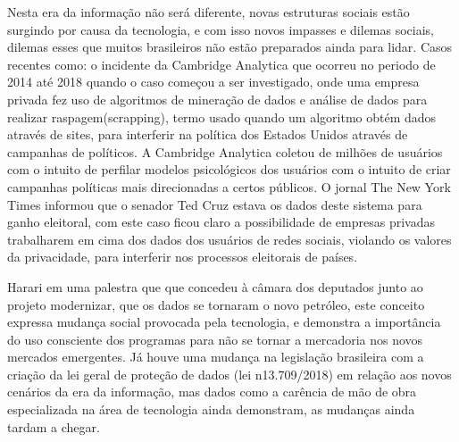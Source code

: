\documentclass[article, 11pt, oneside, a4paper, english, brazil, sumario=tradicional]{abntex2}
\begin{document}
    Nesta era da informação não será diferente, novas estruturas sociais estão
surgindo por causa da tecnologia, e com isso novos impasses e dilemas sociais,
dilemas esses que muitos brasileiros não estão preparados ainda para lidar. Casos
recentes como: o incidente da Cambridge Analytica que ocorreu no periodo de 2014 até 2018 quando o caso começou a ser investigado, onde uma empresa privada fez
uso de algoritmos de mineração de dados e análise de dados para realizar
raspagem(scrapping), termo usado quando um algoritmo obtém dados através de
sites, para interferir na política dos Estados Unidos através de campanhas de
políticos. A Cambridge Analytica coletou de milhões de usuários
com o intuito de perfilar modelos psicológicos dos usuários com o intuito de
criar campanhas políticas mais direcionadas a certos públicos. O jornal The New
York Times informou que o senador Ted Cruz estava os dados deste sistema para
ganho eleitoral, com este caso ficou claro a possibilidade de empresas privadas
trabalharem em cima dos dados dos usuários de redes sociais, violando os valores
da privacidade, para interferir nos processos eleitorais de países.

    Harari em uma palestra que que concedeu à câmara dos deputados junto ao
    projeto modernizar, que os dados se tornaram o novo petróleo, este conceito
    expressa mudança social provocada pela tecnologia, e demonstra a importância
    do uso consciente dos programas para não se tornar a mercadoria nos novos
    mercados emergentes. Já houve uma mudança na legislação brasileira com a
    criação da lei geral de proteção de dados (lei n13.709/2018) em relação aos
    novos cenários da era da informação, mas dados como a carência de mão de
    obra especializada na área de tecnologia ainda demonstram, as mudanças ainda
    tardam a chegar.
\end{document}
